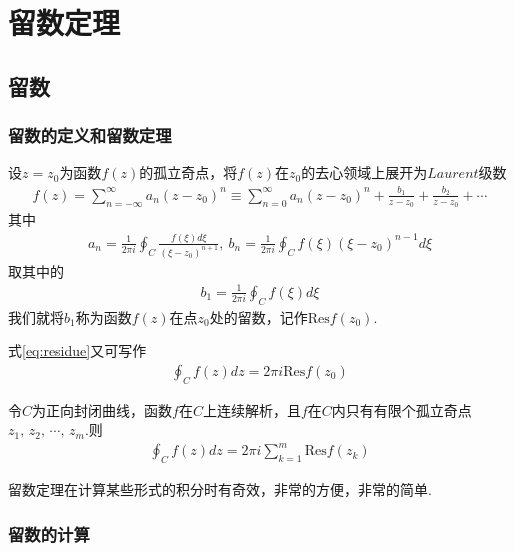 \chapter{留数定理}
\section{留数}
    \subsection{留数的定义和留数定理}
        设$z=z_0$为函数$f(z)$的孤立奇点，将$f(z)$在$z_0$的去心领域上展开为$Laurent$级数
        \begin{align*}
            f(z)=\sum_{n=-\infty}^{\infty}a_n(z-z_0)^n\equiv \sum_{n=0}^{\infty}a_n(z-z_0)^n + \frac{b_1}{z-z_0}+\frac{b_2}{z-z_0}+\cdots
        \end{align*}
        其中
        \begin{align*}
            a_n=\frac1{2\pi i}\oint_C \frac{f(\xi)d\xi}{(\xi - z_0)^{n+1}},\ b_n=\frac1{2\pi i}\oint_C f(\xi)(\xi - z_0)^{n-1}d\xi
        \end{align*}
        取其中的
        \begin{align}
            \label{eq:residue}
            b_1=\frac1{2\pi i}\oint_C f(\xi)d\xi
        \end{align}
        我们就将$b_1$称为函数$f(z)$在点$z_0$处的留数，记作$\mathrm{Res} f(z_0)$.

        式\ref{eq:residue}又可写作
        \begin{align*}
            \oint_C f(z)dz=2\pi i \mathrm{Res} f(z_0)
        \end{align*}

        \begin{theorem}[留数定理]\label{thm:residue_theorem}
            令$C$为正向封闭曲线，函数$f$在$C$上连续解析，且$f$在$C$内只有有限个孤立奇点$z_1,\,z_2,\,\cdots,\,z_m$.则
            \begin{align*}
                \oint_C f(z)dz=2\pi i\sum_{k=1}^{m}\mathrm{Res}f(z_k)
            \end{align*}
        \end{theorem}

        留数定理在计算某些形式的积分时有奇效，非常的方便，非常的简单.

    \subsection{留数的计算}
        

